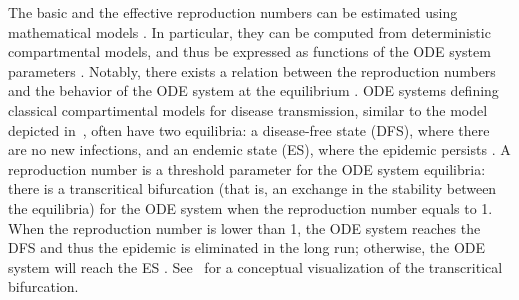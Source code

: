 The basic and the effective reproduction numbers can be estimated using mathematical models \cite[]{Ridenhour2018}. In particular, they can be computed from deterministic compartmental models, and thus be expressed as functions of the ODE system parameters \cite[]{Heffernan2005}. Notably, there exists a relation between the reproduction numbers and the behavior of the ODE system at the equilibrium \cite[]{VanDenDriessche2002,VanDenDriessche2008}. ODE systems defining classical compartimental models for disease transmission, similar to the model depicted in~, often have two equilibria: a disease-free state (DFS), where there are no new infections, and an endemic state (ES), where the epidemic persists \cite[]{Hethcote2000,VanDenDriessche2002}. A reproduction number is a threshold parameter for the ODE system equilibria: there is a transcritical bifurcation (that is, an exchange in the stability between the equilibria) for the ODE system when the reproduction number equals to 1. When the reproduction number is lower than 1, the ODE system reaches the DFS and thus the epidemic is eliminated in the long run; otherwise, the ODE system will reach the ES \cite[]{Hethcote2000,VanDenDriessche2002}. See~ for a conceptual visualization of the transcritical bifurcation.

